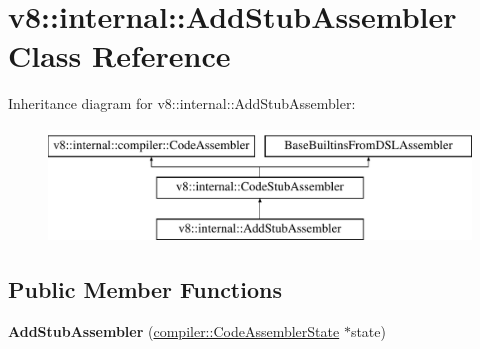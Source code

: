 \hypertarget{classv8_1_1internal_1_1AddStubAssembler}{}\section{v8\+:\+:internal\+:\+:Add\+Stub\+Assembler Class Reference}
\label{classv8_1_1internal_1_1AddStubAssembler}
Inheritance diagram for v8\+:\+:internal\+:\+:Add\+Stub\+Assembler\+:\begin{figure}[H]
\begin{center}
\leavevmode
\includegraphics[height=3.000000cm]{classv8_1_1internal_1_1AddStubAssembler}
\end{center}
\end{figure}
\subsection*{Public Member Functions}
\begin{DoxyCompactItemize}
\item 
\mbox{\label{classv8_1_1internal_1_1AddStubAssembler_a741aeb3d09c3621ac0635ab3b4ef2abf}} 
{\bfseries Add\+Stub\+Assembler} (\mbox{\hyperlink{classv8_1_1internal_1_1compiler_1_1CodeAssemblerState}{compiler\+::\+Code\+Assembler\+State}} $\ast$state)
\end{DoxyCompactItemize}
